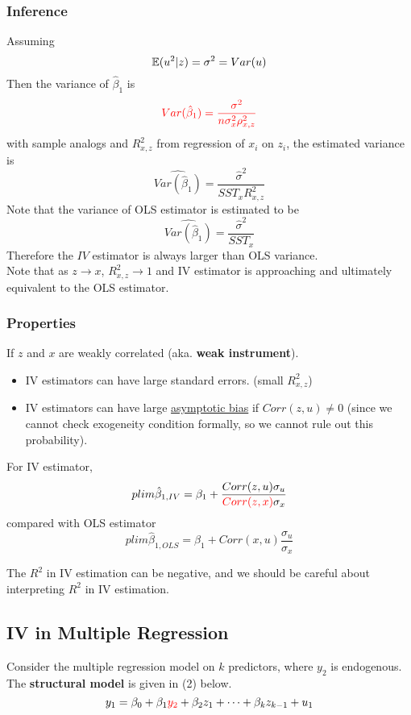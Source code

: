 \documentclass[]{article}
\begin{document}
			\subsubsection{Inference}
				Assuming 
				\[
					\mathbb{E}({u^2|z})=\sigma^2=Var(u)
				\]
				Then the variance of $\hat{\beta}_1$ is 
				\[
				\textcolor{red}{
					Var(\hat{\beta}_1) = \frac{\sigma^2}{n\sigma_x^2 \rho_{x,z}^2}
				}
				\]
				with sample analogs and $R^2_{x,z}$ from regression of $x_i$ on $z_i$, the estimated variance is 
				\[
					\widehat{Var(\hat{\beta}_1)} = \frac{\hat{\sigma}^2}{SST_x R^2_{x,z}}
				\]
				Note that the variance of OLS estimator is estimated to be
				\[
					\widehat{Var(\hat{\beta}_1)} = \frac{\hat{\sigma}^2}{SST_x}
				\]
				Therefore the $IV$ estimator is always larger than OLS variance. \\
				Note that as $z \to x$, $R^2_{x,z} \to 1$ and IV estimator is approaching and ultimately equivalent to the OLS estimator.
			\subsubsection{Properties}
				If $z$ and $x$ are weakly correlated (aka. \textbf{weak instrument}).
				\begin{itemize}
					\item IV estimators can have large standard errors. (small $R^2_{x,z}$)
					\item IV estimators can have large \ul{asymptotic bias} if $Corr(z,u) \neq 0$ (since we cannot check exogeneity condition formally, so we cannot rule out this probability).
				\end{itemize}
				For IV estimator,
				\[
					plim \hat{\beta}_{1, IV} = \beta_1 + \frac{Corr(z,u) \sigma_u}{\textcolor{red}{Corr(z,x)} \sigma_x}
				\]
				compared with OLS estimator
				\[
					plim \hat{\beta}_{1,OLS} = \beta_1 + Corr(x,u) \frac{\sigma_u}{\sigma_x}
				\]
				
				\begin{remark}
					The $R^2$ in IV estimation can be negative, and we should be careful about interpreting $R^2$ in IV estimation.
				\end{remark}
			\subsection{IV in Multiple Regression}
			\par Consider the multiple regression model on $k$ predictors, where $y_2$ is endogenous. The \textbf{structural model} is given in (2) below.
			\begin{equation}
				y_1 = \beta_0 + \beta_1 \textcolor{red}{y_2} + \beta_2 z_1 + \cdots + \beta_k z_{k-1} + u_1
			\end{equation}
\end{document}
